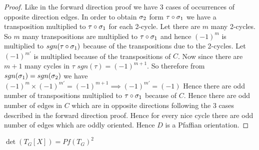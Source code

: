 \begin{proof}
Like in the forward direction proof we have 3 cases of occurrences of opposite direction edges. In order to obtain $\sigma_2$ form $\tau\circ\sigma_1$ we have a transposition multiplied to $\tau\circ\sigma_1$ for each 2-cycle. Let there are $m$ many 2-cycles. So $m$ many transpositions are multiplied to $\tau\circ \sigma_1$ and hence $(-1)^m$ is multiplied to $sgn(\tau\circ \sigma_1)$ because of the transpositions due to the 2-cycles. Let $(-1)^{m'}$ is multiplied because of the transpositions of $C$. Now since there are $m+1$ many cycles in $\tau$ $sgn(\tau)=(-1)^{m+1}$. So therefore from $sgn(\sigma_1)=sgn(\sigma_2)$ we have $(-1)^m\times (-1)^{m'}=(-1)^{m+1}\implies (-1)^{m'}=(-1)$ Hence there are odd number of transpositions multiplied to $\tau\circ \sigma_1$ because of $C$. Hence there are odd number of edges in $C$ which are in opposite directions following the 3 cases described in the forward direction proof. Hence for every nice cycle there are odd number of edges which are oddly oriented. Hence $D$ is a Pfaffian orientation.
\end{proof}
\begin{theorem}\label{thdetpfsq}
	$\det(T_G[X])=Pf(T_G)^2$
\end{theorem}
